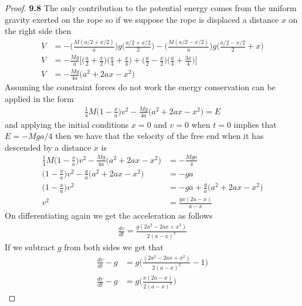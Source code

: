 \documentclass[11pt]{article}
\theoremstyle{definition}
\begin{document}
\begin{proof}{\textbf{9.8}}
        The only contribution to the potential energy comes from the uniform
        gravity exerted on the rope so if we suppose the rope is displaced a
        distance $x$ on the right side then
        \begin{align*}
            V &= -\bigg(\frac{M(a/2 + x/2)}{a}\bigg)g\bigg(\frac{a/2 + x/2}{2}\bigg)
            - \bigg(\frac{M(a/2 - x/2)}{a}\bigg)g\bigg(\frac{a/2 - x/2}{2} + x\bigg)\\
            V &= -\frac{Mg}{a}\bigg[\bigg(\frac{a}{2} + \frac{x}{2}\bigg)
            \bigg(\frac{a}{4} + \frac{x}{4}\bigg)
            + \bigg(\frac{a}{2} - \frac{x}{2}\bigg)
            \bigg(\frac{a}{4}+\frac{3x}{4}\bigg)\bigg]\\
            V &= -\frac{Mg}{4a}\bigg(a^2 + 2ax - x^2\bigg)
        \end{align*}
        Assuming the constraint forces do not work the energy conservation can
        be applied in the form
        \begin{align*}
            \frac{1}{4}M\Bigg(1 - \frac{x}{a}\Bigg)v^2
            -\frac{Mg}{4a}\bigg(a^2 + 2ax - x^2\bigg) = E
        \end{align*}
        and applying the initial conditions $x=0$ and $v = 0$ when 
        $t=0$ implies that $E = -Mga/4$ then we have that the velocity of the
        free end when it has descended by a distance $x$ is
        \begin{align*}
            \frac{1}{4}M\Bigg(1 - \frac{x}{a}\Bigg)v^2
            -\frac{Mg}{4a}\bigg(a^2 + 2ax - x^2\bigg) &= -\frac{Mga}{4}\\
            \Bigg(1 - \frac{x}{a}\Bigg)v^2
            -\frac{g}{a}\bigg(a^2 + 2ax - x^2\bigg) &= -ga\\
            \Bigg(1 - \frac{x}{a}\Bigg)v^2 &= 
            -ga +\frac{g}{a}\bigg(a^2 + 2ax - x^2\bigg)\\
            v^2 &=  \frac{gx(2a - x)}{a-x} 
        \end{align*}
        On differentiating again we get the acceleration as follows
        \begin{align*}
            \frac{dv}{dt} = \frac{g(2a^2-2ax+x^2)}{2(a-x)^2}
        \end{align*}
        If we subtract $g$ from both sides we get that
        \begin{align*}
            \frac{dv}{dt}-g &= g\bigg(\frac{(2a^2-2ax+x^2)}{2(a-x)^2} - 1\bigg)\\
            \frac{dv}{dt}-g &= g\bigg(\frac{x(2a-x)}{2(a-x)^2}\bigg)

\end{align*}
\end{proof}
\end{document}
